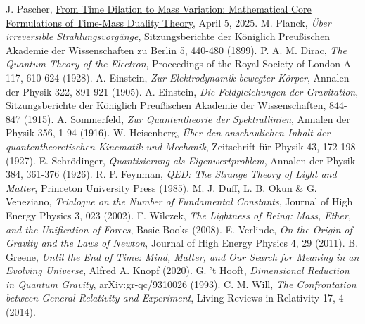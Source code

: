 \documentclass[12pt,a4paper]{article}
\begin{document}
\begin{thebibliography}{99}
	 J. Pascher, \href{https://github.com/jpascher/T0-Time-Mass-Duality/tree/main/2/pdf/English/MathZeitMasseLagrangeEn.pdf}{From Time Dilation to Mass Variation: Mathematical Core Formulations of Time-Mass Duality Theory}, April 5, 2025.
	 M. Planck, \textit{Über irreversible Strahlungsvorgänge}, Sitzungsberichte der Königlich Preußischen Akademie der Wissenschaften zu Berlin 5, 440-480 (1899).
	 P. A. M. Dirac, \textit{The Quantum Theory of the Electron}, Proceedings of the Royal Society of London A 117, 610-624 (1928).
	 A. Einstein, \textit{Zur Elektrodynamik bewegter Körper}, Annalen der Physik 322, 891-921 (1905).
	 A. Einstein, \textit{Die Feldgleichungen der Gravitation}, Sitzungsberichte der Königlich Preußischen Akademie der Wissenschaften, 844-847 (1915).
	 A. Sommerfeld, \textit{Zur Quantentheorie der Spektrallinien}, Annalen der Physik 356, 1-94 (1916).
	 W. Heisenberg, \textit{Über den anschaulichen Inhalt der quantentheoretischen Kinematik und Mechanik}, Zeitschrift für Physik 43, 172-198 (1927).
	 E. Schrödinger, \textit{Quantisierung als Eigenwertproblem}, Annalen der Physik 384, 361-376 (1926).
	 R. P. Feynman, \textit{QED: The Strange Theory of Light and Matter}, Princeton University Press (1985).
	 M. J. Duff, L. B. Okun \& G. Veneziano, \textit{Trialogue on the Number of Fundamental Constants}, Journal of High Energy Physics 3, 023 (2002).
	 F. Wilczek, \textit{The Lightness of Being: Mass, Ether, and the Unification of Forces}, Basic Books (2008).
	 E. Verlinde, \textit{On the Origin of Gravity and the Laws of Newton}, Journal of High Energy Physics 4, 29 (2011).
	 B. Greene, \textit{Until the End of Time: Mind, Matter, and Our Search for Meaning in an Evolving Universe}, Alfred A. Knopf (2020).
	 G. 't Hooft, \textit{Dimensional Reduction in Quantum Gravity}, arXiv:gr-qc/9310026 (1993).
	 C. M. Will, \textit{The Confrontation between General Relativity and Experiment}, Living Reviews in Relativity 17, 4 (2014).
\end{thebibliography}
\end{document}
